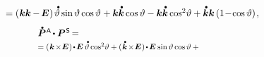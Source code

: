 \begin{otherlanguage}{russian}
\begin{fleqn}[0pt]
\begin{multline*}
%
\shoveright{\hfill \hspace{4.8em} \scalebox{0.94}[0.96]{$= \left( \hspace{.1ex} \bm{k} \bm{k} \hspace{-0.1ex} - \hspace{-0.2ex} \UnitDyad \hspace{.1ex} \right) \hspace{-0.1ex} \mathdotabove{\vartheta} \operatorname{sin} \vartheta \operatorname{cos} \vartheta \hspace{.1ex}
+ \bm{k} \mathdotabove{\bm{k}} \operatorname{cos} \vartheta
- \bm{k} \mathdotabove{\bm{k}} \operatorname{cos}^{2\hspace{-0.4ex}} \vartheta
+ \mathdotabove{\bm{k}} \bm{k} \left({1 \!-\! \operatorname{cos} \vartheta}\right) \hspace{-0.16ex},$}}
\end{multline*}
\begin{multline*}
\shoveleft{\scalebox{0.94}[0.96]{$\mathdotabove{\bm{P}}^{\mathsf{\hspace{.12ex}A}} \hspace{-0.2ex}\dotp \bm{P}^{\mathsf{\hspace{.12ex}S}} \hspace{-0.25ex} = $} \hfill} \\[-0.25em]
%
\shoveleft{\scalebox{0.8}[0.82]{$= ( \hspace{.12ex} \bm{k} \hspace{-0.24ex}\times\hspace{-0.4ex} \UnitDyad \hspace{.1ex} ) \hspace{-0.2ex} \dotp \hspace{-0.2ex} \UnitDyad \hspace{.4ex} \mathdotabove{\vartheta} \operatorname{cos}^{2\hspace{-0.4ex}} \vartheta +
( \hspace{.12ex} \mathdotabove{\bm{k}} \hspace{-0.24ex}\times\hspace{-0.4ex} \UnitDyad \hspace{.1ex} ) \hspace{-0.2ex} \dotp \hspace{-0.2ex} \UnitDyad \hspace{.1ex} \operatorname{sin} \vartheta \operatorname{cos} \vartheta \:+$} \hfill} \\[-0.2em]

\end{multline*}
\end{fleqn}
\end{otherlanguage}
